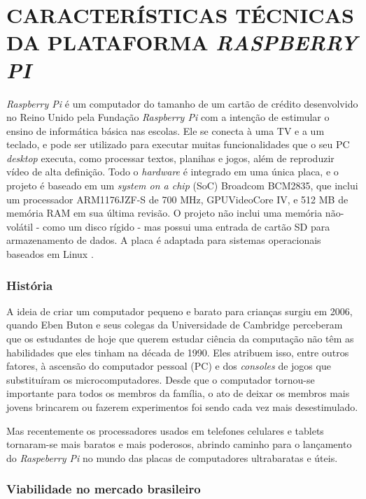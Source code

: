 \chapter{CARACTERÍSTICAS TÉCNICAS DA PLATAFORMA \textit{RASPBERRY PI}}

\textit{Raspberry Pi} é um computador do tamanho de um cartão de crédito desenvolvido no Reino Unido pela Fundação \textit{Raspberry Pi} com a intenção de estimular o ensino de informática básica nas escolas. Ele se conecta à uma TV e a um teclado, e pode ser utilizado para executar muitas funcionalidades que o seu PC \textit{desktop} executa, como processar textos, planihas e jogos, além de reproduzir vídeo de alta definição. Todo o \textit{hardware} é integrado em uma única placa, e o projeto é baseado em um \textit{system on a chip} (SoC) Broadcom BCM2835, que inclui um processador ARM1176JZF-S de 700 MHz, GPUVideoCore IV, e 512 MB de memória RAM em sua última revisão. O projeto não inclui uma memória não-volátil - como um disco rígido - mas possui uma entrada de cartão SD para armazenamento de dados. A placa é adaptada para sistemas operacionais baseados em Linux \cite{WIKIPEDIA2}.

\subsection{História}

A ideia de criar um computador pequeno e barato para crianças surgiu em 2006, quando Eben Buton e seus colegas da Universidade de Cambridge perceberam que os estudantes de hoje que querem estudar ciência da computação não têm as habilidades que eles tinham na década de 1990. Eles atribuem isso, entre outros fatores, à ascensão do computador pessoal (PC) e dos \textit{consoles} de jogos que substituíram os microcomputadores. Desde que o computador tornou-se importante para todos os membros da família, o ato de deixar os membros mais jovens brincarem ou fazerem experimentos foi sendo cada vez mais desestimulado.

Mas recentemente os processadores usados em telefones celulares e tablets tornaram-se mais baratos e mais poderosos, abrindo caminho para o lançamento do \textit{Raspeberry Pi} no mundo das placas de computadores ultrabaratas e úteis.

\subsection{Viabilidade no mercado brasileiro}

